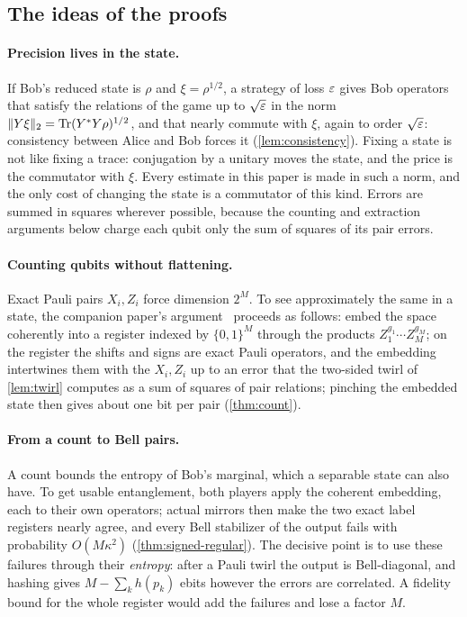 \subsection{The ideas of the proofs}\label{sec:intro-ideas}

\paragraph{Precision lives in the state.} If Bob's reduced state is $\rho$ and $\xi=\rho^{1/2}$, a strategy of loss $\varepsilon$ gives Bob
operators that satisfy the relations of the game up to $\sqrt{\varepsilon}$ in the norm $\lVert Y\xi\rVert_2=\operatorname{Tr}(Y^*Y\rho)^{1/2}$, and that nearly
commute with $\xi$, again to order $\sqrt{\varepsilon}$: consistency between Alice and Bob forces it (\cref{lem:consistency}). Fixing a state
is not like fixing a trace: conjugation by a unitary moves the state, and the price is the commutator with $\xi$. Every estimate
in this paper is made in such a norm, and the only cost of changing the state is a commutator of this kind. Errors are summed in
squares wherever possible, because the counting and extraction arguments below charge each qubit only the sum of squares of its
pair errors.

\paragraph{Counting qubits without flattening.} Exact Pauli pairs $X_i,Z_i$ force dimension $2^M$. To see approximately the same in a
state, the companion paper's argument~\cite[Section~4]{DM-game} proceeds as follows: embed the space coherently into a register indexed by $\{0,1\}^M$ through the products $Z_1^{g_1}\cdots Z_M^{g_M}$; on the
register the shifts and signs are exact Pauli operators, and the embedding intertwines them with the $X_i,Z_i$ up to an error
that the two-sided twirl of \cref{lem:twirl} computes as a sum of squares of pair relations; pinching the embedded state then
gives about one bit per pair (\cref{thm:count}).

\paragraph{From a count to Bell pairs.} A count bounds the entropy of Bob's marginal, which a separable state can also have. To get
usable entanglement, both players apply the coherent embedding, each to their own operators; actual mirrors then make the two
exact label registers nearly agree, and every Bell stabilizer of the output fails with probability $O(M\kappa^2)$
(\cref{thm:signed-regular}). The decisive point is to use these failures through their \emph{entropy}: after a Pauli twirl the
output is Bell-diagonal, and hashing gives $M-\sum_kh(p_k)$ ebits however the errors are correlated. A fidelity bound for the
whole register would add the failures and lose a factor $M$.

